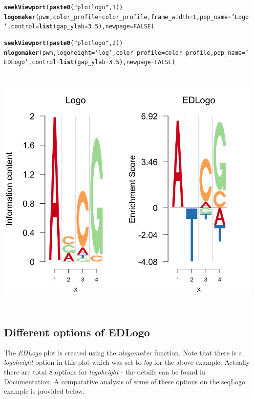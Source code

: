 \documentclass[12pt]{article}\usepackage[]{graphicx}\usepackage[usenames,dvipsnames]{color}
\makeatletter
\newcommand{\hlnum}[1]{\textcolor[rgb]{0.686,0.059,0.569}{#1}}%
\newcommand{\hlstr}[1]{\textcolor[rgb]{0.192,0.494,0.8}{#1}}%
\newcommand{\hlstd}[1]{\textcolor[rgb]{0.345,0.345,0.345}{#1}}%
\newcommand{\hlkwc}[1]{\textcolor[rgb]{0.333,0.667,0.333}{#1}}%
\newcommand{\hlkwd}[1]{\textcolor[rgb]{0.737,0.353,0.396}{\textbf{#1}}}%
\newenvironment{kframe}{%
 \def\at@end@of@kframe{}%
 \ifinner\ifhmode%
  \def\at@end@of@kframe{\end{minipage}}%
  \begin{minipage}{\columnwidth}%
 \fi\fi%
 \def\FrameCommand##1{\hskip\@totalleftmargin \hskip-\fboxsep
 \colorbox{shadecolor}{##1}\hskip-\fboxsep
     \hskip-\linewidth \hskip-\@totalleftmargin \hskip\columnwidth}%
 \MakeFramed {\advance\hsize-\width
   \@totalleftmargin\z@ \linewidth\hsize
   \@setminipage}}%
 {\par\unskip\endMakeFramed%
 \at@end@of@kframe}
\newenvironment{knitrout}{}{} %
\makeatother
\begin{document}
\begin{knitrout}
\begin{kframe}
\begin{alltt}
\hlkwd{seekViewport}\hlstd{(}\hlkwd{paste0}\hlstd{(}\hlstr{"plotlogo"}\hlstd{,} \hlnum{1}\hlstd{))}
\hlkwd{logomaker}\hlstd{(pwm,}\hlkwc{color_profile}\hlstd{=color_profile,}\hlkwc{frame_width} \hlstd{=} \hlnum{1}\hlstd{,}\hlkwc{pop_name} \hlstd{=} \hlstr{'Logo'}\hlstd{,}\hlkwc{control} \hlstd{=} \hlkwd{list}\hlstd{(}\hlkwc{gap_ylab}\hlstd{=}\hlnum{3.5}\hlstd{),} \hlkwc{newpage} \hlstd{=} \hlnum{FALSE}\hlstd{)}

\hlkwd{seekViewport}\hlstd{(}\hlkwd{paste0}\hlstd{(}\hlstr{"plotlogo"}\hlstd{,} \hlnum{2}\hlstd{))}
\hlkwd{nlogomaker}\hlstd{(pwm,}\hlkwc{logoheight} \hlstd{=} \hlstr{'log'}\hlstd{,}\hlkwc{color_profile} \hlstd{= color_profile,}\hlkwc{pop_name} \hlstd{=} \hlstr{'EDLogo'}\hlstd{,}\hlkwc{control} \hlstd{=} \hlkwd{list}\hlstd{(}\hlkwc{gap_ylab}\hlstd{=}\hlnum{3.5}\hlstd{),} \hlkwc{newpage} \hlstd{=} \hlnum{FALSE}\hlstd{)}
\end{alltt}
\end{kframe}
\includegraphics[width=6in,height=5in]{figure/edlogo-1} 

\end{knitrout}


\subsection{Different options of EDLogo}

The \textit{EDLogo} plot is created using the \textit{nlogomaker} function. Note that there is a \textit{logoheight} option in this plot which was set to \textit{log} for the above example. Actually there are total $8$ options for \textit{logoheight} - the details can be found in Documentation. A comparative analysis of some of these options on the seqLogo example is provided below.
\end{document}
